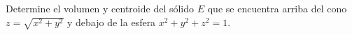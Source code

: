\item Determine el volumen y centroide del sólido $E$ que se encuentra arriba del cono $z = \sqrt{x^2 + y^2}$ y debajo de la esfera $x^2 + y^2 + z^2 = 1$.
